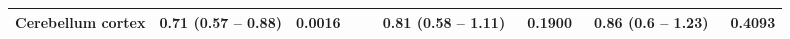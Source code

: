 \begin{sidewaystable}
{\begin{tabular}{|l|lr|lr|lr|lr|}
\hline
Cerebellum cortex & \textcolor[rgb]{0.2,0.2,0.2}{0.71 (0.57 -- 0.88)} & \textcolor[rgb]{0.2,0.2,0.2}{\textbf{0.0016}} & {\cellcolor[rgb]{0.753,0.753,0.753}} & {\cellcolor[rgb]{0.753,0.753,0.753}} & \textcolor[rgb]{0.2,0.2,0.2}{0.81 (0.58 -- 1.11)~} & \textcolor[rgb]{0.2,0.2,0.2}{0.1900}\textcolor[rgb]{0.2,0.2,0.2}{~} & \textcolor[rgb]{0.2,0.2,0.2}{0.86 (0.6 -- 1.23)~} & \textcolor[rgb]{0.2,0.2,0.2}{0.4093} \\
\hline
\end{tabular}
}
\end{sidewaystable}
